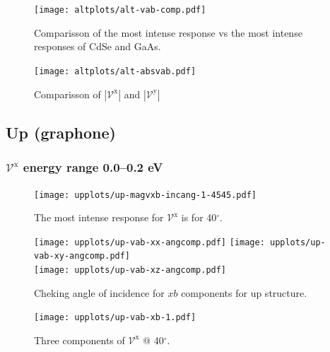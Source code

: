 \documentclass[twocolumn]{article}
\let\Oldsubsection\subsection
\renewcommand{\subsection}{\FloatBarrier\Oldsubsection}
\let\Oldsubsubsection\subsubsection
\renewcommand{\subsubsection}{\FloatBarrier\Oldsubsubsection}
\begin{document}
\begin{figure}[ht]
    \centering
    \texttt{[image: altplots/alt-vab-comp.pdf]}
    \caption{Comparisson of the most intense response vs the most intense
    responses of CdSe and GaAs.}
    \label{fig:alt-comp}
\end{figure}

\begin{figure}[ht]
    \centering
    \texttt{[image: altplots/alt-absvab.pdf]}
    \caption{Comparisson of $|\mathcal{V}^{\mathrm{x}}|$ and $|\mathcal{V}^{\mathrm{y}}|$}    
    \label{fig:alt-xbybcomp}
\end{figure}




\subsection{Up (graphone)} %
\label{sec:results-up}



\subsubsection{$\mathcal{V}^{\mathrm{x}}$ energy range 0.0--0.2 eV }
\begin{figure}[h]
    \centering
    \texttt{[image: upplots/up-magvxb-incang-1-4545.pdf]}
    \caption{The most intense response for $\mathcal{V}^{\mathrm{x}} $ is for 
    40$^{\circ}$.}
    \label{fig:up-magvxbincang1}
\end{figure}
\begin{figure}[ht]
    \centering
    \texttt{[image: upplots/up-vab-xx-angcomp.pdf]}
    \texttt{[image: upplots/up-vab-xy-angcomp.pdf]}\\
    \texttt{[image: upplots/up-vab-xz-angcomp.pdf]}
    \caption{Cheking angle of incidence for $xb$ components for up structure.}
    \label{fig:up-xbangcomp}
\end{figure}
\begin{figure}[tb]
    \centering
    \texttt{[image: upplots/up-vab-xb-1.pdf]}
    \caption{Three components of $\mathcal{V}^{\mathrm{x}} $ @ 40$^{\circ}$.}
    \label{fig:up-vxb1}
\end{figure}
\end{document}
